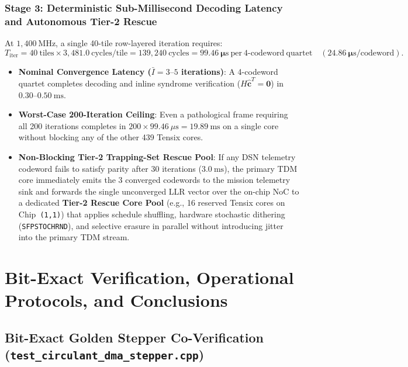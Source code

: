 \documentclass[10pt]{article}
\begin{document}
\subsubsection{Stage 3: Deterministic Sub-Millisecond Decoding Latency and Autonomous Tier-2 Rescue}
At $1,400\ \mathrm{MHz}$, a single 40-tile row-layered iteration requires:
\begin{equation}
T_{\mathrm{iter}} = 40\ \text{tiles} \times 3,481.0\ \text{cycles/tile} = 139,240\ \text{cycles} = \mathbf{99.46\ \mu\mathrm{s\ per\ 4\text{-}codeword\ quartet}} \quad (\mathbf{24.86\ \mu\mathrm{s/codeword}}).
\end{equation}
\begin{itemize}[leftmargin=1.8em, itemsep=2pt]
    \item \textbf{Nominal Convergence Latency ($\bar{I} = 3\text{--}5$ iterations)}: A 4-codeword quartet completes decoding and inline syndrome verification ($H\hat{\mathbf{c}}^T = \mathbf{0}$) in $\mathbf{0.30\text{--}0.50\ \mathrm{ms}}$.
    \item \textbf{Worst-Case 200-Iteration Ceiling}: Even a pathological frame requiring all 200 iterations completes in $200 \times 99.46\ \mu\mathrm{s} = \mathbf{19.89\ \mathrm{ms}}$ on a single core without blocking any of the other 439 Tensix cores.
    \item \textbf{Non-Blocking Tier-2 Trapping-Set Rescue Pool}: If any DSN telemetry codeword fails to satisfy parity after 30 iterations ($3.0\ \mathrm{ms}$), the primary TDM core immediately emits the 3 converged codewords to the mission telemetry sink and forwards the single unconverged LLR vector over the on-chip NoC to a dedicated \textbf{Tier-2 Rescue Core Pool} (e.g., 16 reserved Tensix cores on Chip~\texttt{(1,1)}) that applies schedule shuffling, hardware stochastic dithering (\texttt{SFPSTOCHRND}), and selective erasure in parallel without introducing jitter into the primary TDM stream.
\end{itemize}

\section{Bit-Exact Verification, Operational Protocols, and Conclusions}
\label{sec:verification_conclusions}

\subsection{Bit-Exact Golden Stepper Co-Verification (\texttt{test\_circulant\_dma\_stepper.cpp})}
\end{document}

